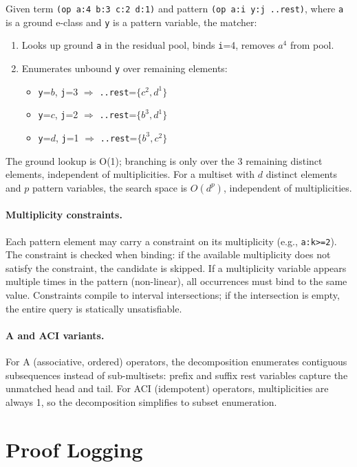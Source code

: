 \documentclass[sigplan,nonacm]{acmart}
\begin{document}
Given term \texttt{(op a:4 b:3 c:2 d:1)} and pattern
\texttt{(op a:i y:j ..rest)}, where \texttt{a} is a ground e-class
and \texttt{y} is a pattern variable, the matcher:
\begin{enumerate}
\item Looks up ground \texttt{a} in the residual pool, binds
  \texttt{i}=4, removes $a^4$ from pool.
\item Enumerates unbound \texttt{y} over remaining elements:
  \begin{itemize}
  \item \texttt{y}=$b$, \texttt{j}=3 $\Rightarrow$
    \texttt{..rest}=$\{c^2, d^1\}$
  \item \texttt{y}=$c$, \texttt{j}=2 $\Rightarrow$
    \texttt{..rest}=$\{b^3, d^1\}$
  \item \texttt{y}=$d$, \texttt{j}=1 $\Rightarrow$
    \texttt{..rest}=$\{b^3, c^2\}$
  \end{itemize}
\end{enumerate}
The ground lookup is O(1); branching is only over the 3 remaining
distinct elements, independent of multiplicities.  For a multiset
with $d$ distinct elements and $p$ pattern variables, the search
space is $O(d^p)$, independent of multiplicities.

\paragraph{Multiplicity constraints.}  Each pattern element may
carry a constraint on its multiplicity (e.g., \texttt{a:k>=2}).
The constraint is checked when binding: if the available multiplicity
does not satisfy the constraint, the candidate is skipped.  If a
multiplicity variable appears multiple times in the pattern
(non-linear), all occurrences must bind to the same value.
Constraints compile to interval intersections; if the intersection
is empty, the entire query is statically unsatisfiable.

\paragraph{A and ACI variants.}  For A (associative, ordered)
operators, the decomposition enumerates contiguous subsequences
instead of sub-multisets: prefix and suffix rest variables capture
the unmatched head and tail.  For ACI (idempotent) operators,
multiplicities are always 1, so the decomposition simplifies to
subset enumeration.

\section{Proof Logging}
\end{document}
